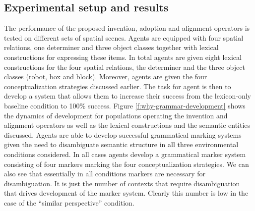 \subsection{Experimental setup and results}
The performance of the proposed invention, adoption and 
alignment operators is tested on different sets of spatial scenes. Agents are equipped 
with four spatial relations, one determiner and three object classes together 
with lexical constructions for expressing these items. In total
agents are given eight lexical constructions for the four spatial relations, the 
determiner and the three object classes (robot, box and block). Moreover, 
agents are given the four conceptualization strategies discussed earlier. The task for agent is then to develop a system that allows them to increase their success 
from the lexicon-only baseline condition to 100\% success. Figure 
\ref{f:why-grammar-development} shows the dynamics of development for 
populations operating the invention and alignment operators as well as 
the lexical constructions and the semantic entities discussed. Agents are able 
to develop successful grammatical marking systems given the need 
to disambiguate semantic structure in all three environmental conditions considered. 
In all cases agents develop a grammatical marker system
consisting of four markers marking the four conceptualization strategies. 
We can also see that essentially in all conditions markers are necessary for disambiguation. It is just the number of contexts that require disambiguation 
that drives development of the marker system.
Clearly this number is low in the case of the ``similar perspective'' condition.



